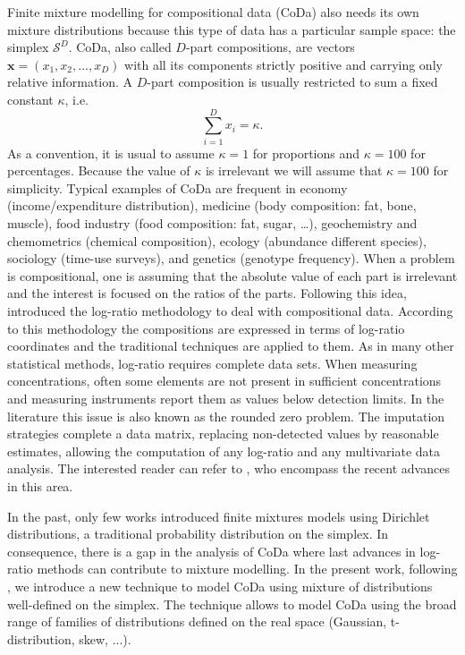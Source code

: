 \documentclass[12pt, a4paper]{article}
\begin{document}
Finite mixture modelling for compositional data (CoDa) also needs its own mixture distributions because this type of data has a particular sample space: the simplex $\mathcal{S}^D$.
CoDa, also called $D$-part compositions, are vectors $\textbf{x} = (x_1, x_2, ..., x_D)$ with all its components strictly positive  and carrying only relative information. A $D$-part composition is usually restricted to sum a fixed constant $\kappa$, i.e.
\begin{equation}
\sum_{i=1 }^D x_i = \kappa.
\label{sum_to_constant}
\end{equation}
As a convention, it is usual to assume $\kappa =1$ for proportions and $\kappa = 100$ for percentages. Because
the value of $\kappa$ is irrelevant we will assume that $\kappa = 100$ for simplicity. Typical examples of CoDa are frequent in economy (income/expenditure distribution), medicine (body composition: fat, bone, muscle), food industry (food composition: fat, sugar, …), geochemistry and chemometrics (chemical composition), ecology (abundance different species), sociology (time-use surveys), and genetics (genotype frequency). 
When a problem is compositional, one is assuming that the absolute value of each part is irrelevant and the interest is focused on the ratios of the parts. Following this idea, \cite{aitchison1986statistical} introduced the log-ratio methodology to deal with compositional data. According to this methodology 
the compositions are expressed in terms of log-ratio coordinates and the traditional techniques are applied to them.
As in many other statistical methods, log-ratio requires complete data sets. When measuring concentrations, often some elements are not present in sufficient concentrations and measuring instruments report them as values below detection limits. In the literature this issue is also known as the rounded zero problem. The imputation strategies complete a data matrix, replacing non-detected values by reasonable estimates, allowing the computation of any log-ratio and any multivariate data analysis. The interested reader can refer to \cite{palarea2014compositional}, who encompass the recent advances in this area.


In the past, only few works \citep[e.g.,][]{albert1982mixtures, bouguila2004unsupervised} introduced finite mixtures models using Dirichlet distributions, a traditional probability distribution on the simplex. In consequence, there is a gap in the analysis of CoDa where last advances in log-ratio methods can contribute to mixture modelling. In the present work, following \cite{mateu2013normal}, we introduce a new technique to model CoDa using mixture of distributions well-defined on the simplex. The technique allows to model CoDa using the broad range of families of distributions defined on the real space (Gaussian, t-distribution, skew, ...).
\end{document}
